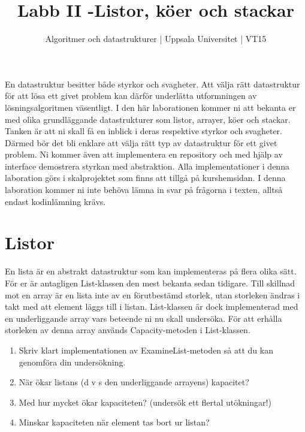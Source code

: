 \documentclass{article}
\begin{document}
  \title{Labb II -Listor, köer och stackar }
  \author{ Algoritmer och datastrukturer | Uppsala Universitet | VT15 }
  \date{}
  \maketitle


  \section*{}
   En datastruktur besitter både styrkor och svagheter. Att välja rätt datastruktur för att
   lösa ett givet problem kan därför underlätta utformningen av lösningsalgoritmen väsentligt.
   I den här laborationen kommer ni att bekanta er med olika grundläggande datastrukturer
   som listor, arrayer, köer och stackar. Tanken är att ni skall få en inblick i deras respektive
   styrkor och svagheter. Därmed bör det bli enklare att välja rätt typ av datastruktur för ett
   givet problem. Ni kommer även att implementera en repository och med hjälp av interface demostrera styrkan med abstraktion. Alla implementationer i denna laboration
   görs i skalprojektet som finns att tillgå på kurshemsidan. I denna laboration kommer ni inte behöva lämna in svar på frågorna i texten, alltså endast kodinlämning krävs.



  \section*{Listor
  }

  En lista är en abstrakt datastruktur som kan implementeras på flera olika sätt. För er är
  antagligen List-klassen den mest bekanta sedan tidigare. Till skillnad mot en array är en
  lista inte av en förutbestämd storlek, utan storleken ändras i takt med att element läggs
  till i listan. List-klassen är dock implementerad med en underliggande array vars beteende
  ni nu skall undersöka. För att erhålla storleken av denna array används Capacity-metoden i
  List-klassen.
  
  \begin{enumerate}
    \item Skriv klart implementationen av ExamineList-metoden så att du kan genomföra din
    undersökning.
    \item När ökar listans (d v s den underliggande arrayens) kapacitet?
    \item Med hur mycket ökar kapaciteten? (undersök ett flertal utökningar!)
    \item Minskar kapaciteten när element tas bort ur listan?
  \end{enumerate}
  
\end{document}
